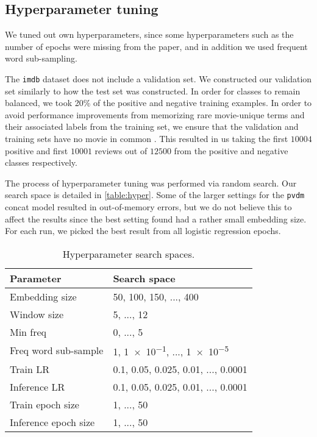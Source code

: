 \documentclass{article}
\begin{document}
\subsection{Hyperparameter tuning}
We tuned out own hyperparameters, since some hyperparameters such as the number of epochs were missing from the paper, and in addition we used frequent word sub-sampling.

The \texttt{imdb} dataset does not include a validation set. We constructed our validation set similarly to how the test set was constructed. In order for classes to remain balanced, we took 20\% of the positive and negative training examples. In order to avoid performance improvements from memorizing rare movie-unique terms and their associated labels from the training set, we ensure that the validation and training sets have no movie in common \citep{maas-EtAl:2011:ACL-HLT2011}. This resulted in us taking the first $10004$ positive and first $10001$ reviews out of $12500$ from the positive and negative classes respectively.

The process of hyperparameter tuning was performed via random search. Our search space is detailed in \autoref{table:hyper}. Some of the larger settings for the \texttt{pvdm} concat model resulted in out-of-memory errors, but we do not believe this to affect the results since the best setting found had a rather small embedding size. For each run, we picked the best result from all logistic regression epochs.

\begin{table}[htbp]\centering
\setlength\tabcolsep{2pt}
\begin{tabular}{|l|l|}
    \hline
    Parameter               & Search space \\ \hline
    Embedding size          & 50, 100, 150, ..., 400 \\
    Window size             & 5, ..., 12 \\
    Min freq                & 0, ..., 5 \\
    Freq word sub-sample    & 1, \num{1e-1}, ..., \num{1e-5} \\
    Train LR                & 0.1, 0.05, 0.025, 0.01, ..., 0.0001 \\
    Inference LR            & 0.1, 0.05, 0.025, 0.01, ..., 0.0001 \\
    Train epoch size        & 1, ..., 50 \\
    Inference epoch size    & 1, ..., 50 \\
    \hline
\end{tabular}
\caption{Hyperparameter search spaces.}
\label{table:hyper}
\end{table}
\end{document}
